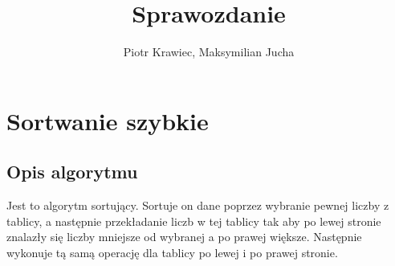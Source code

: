 \documentclass[11pt]{article}
\author{Piotr Krawiec, Maksymilian Jucha}
\title{Sprawozdanie}
\begin{document}
    
    \maketitle
    
    

    
    \hypertarget{sortwanie-szybkie}{%
\section{Sortwanie szybkie}\label{sortwanie-szybkie}}

\hypertarget{opis-algorytmu}{%
\subsection{Opis algorytmu}\label{opis-algorytmu}}

Jest to algorytm sortujący. Sortuje on dane poprzez wybranie pewnej
liczby z tablicy, a następnie przekładanie liczb w tej tablicy tak aby
po lewej stronie znalazły się liczby mniejsze od wybranej a po prawej
większe. Następnie wykonuje tą samą operację dla tablicy po lewej i po
prawej stronie.
\end{document}
